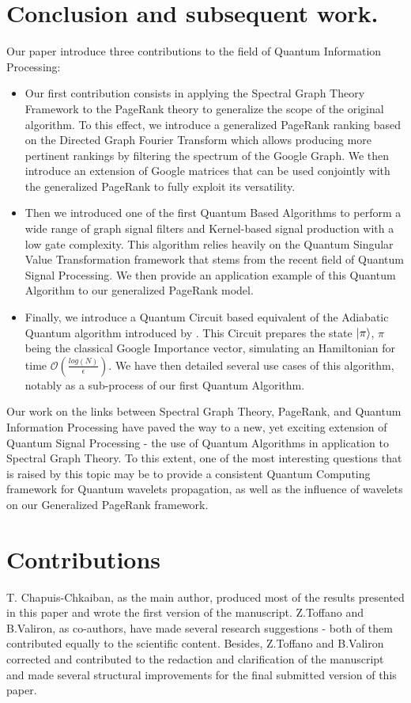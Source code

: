 \documentclass{article}
\begin{document}
\section{Conclusion and subsequent work.}
Our paper introduce three contributions to the field of Quantum Information Processing:

\begin{itemize}
    \item Our first contribution consists in applying the Spectral Graph Theory Framework to the PageRank theory to generalize the scope of the original algorithm. To this effect, we introduce a generalized PageRank ranking based on the Directed Graph Fourier Transform which allows producing more pertinent rankings by filtering the spectrum of the Google Graph. We then introduce an extension of Google matrices that can be used conjointly with the generalized PageRank to fully exploit its versatility.
    
    \item Then we introduced one of the first Quantum Based Algorithms to perform a wide range of graph signal filters and Kernel-based signal production with a low gate complexity. This algorithm relies heavily on the Quantum Singular Value Transformation framework that stems from the recent field of Quantum Signal Processing. We then provide an application example of this Quantum Algorithm to our generalized PageRank model.
    
    \item Finally, we introduce a Quantum Circuit based equivalent of the Adiabatic Quantum algorithm introduced by \cite{garnerone_zanardi_lidar_2012}. This Circuit prepares the state $\ket{\pi}$, $\pi$ being the classical Google Importance vector, simulating an Hamiltonian for time $\mathcal{O}(\frac{log(N)}{\epsilon})$. We have then detailed several use cases of this algorithm, notably as a sub-process of our first Quantum Algorithm.
    
\end{itemize}

Our work on the links between Spectral Graph Theory, PageRank, and Quantum Information Processing have paved the way to a new, yet exciting extension of Quantum Signal Processing - the use of Quantum Algorithms in application to Spectral Graph Theory. To this extent, one of the most interesting questions that is raised by this topic may be to provide a consistent Quantum Computing framework for Quantum wavelets propagation, as well as the influence of wavelets on our Generalized PageRank framework. 


\section{Contributions}
T. Chapuis-Chkaiban, as the main author, produced most of the results presented in this paper and wrote the first version of the manuscript. Z.Toffano and B.Valiron, as co-authors, have made several research suggestions - both of them contributed equally to the scientific content. Besides, Z.Toffano and B.Valiron corrected and contributed to the redaction and clarification of the manuscript and made several structural improvements for the final submitted version of this paper. 

\printbibliography
\end{document}
